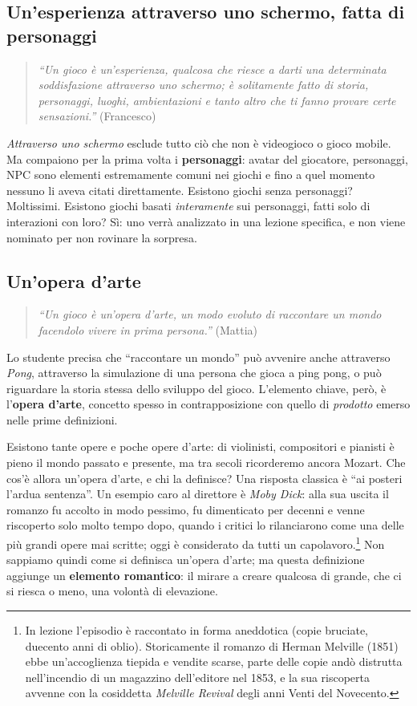 \subsection{Un'esperienza attraverso uno schermo, fatta di personaggi}

\begin{quote}
\emph{``Un gioco è un'esperienza, qualcosa che riesce a darti una determinata
soddisfazione attraverso uno schermo; è solitamente fatto di storia,
personaggi, luoghi, ambientazioni e tanto altro che ti fanno provare certe
sensazioni.''} (Francesco)
\end{quote}

\emph{Attraverso uno schermo} esclude tutto ciò che non è videogioco o gioco
mobile. Ma compaiono per la prima volta i \textbf{personaggi}: avatar del
giocatore, personaggi, NPC sono elementi estremamente comuni nei giochi e
fino a quel momento nessuno li aveva citati direttamente. Esistono giochi
senza personaggi? Moltissimi. Esistono giochi basati \emph{interamente} sui
personaggi, fatti solo di interazioni con loro? Sì: uno verrà analizzato in
una lezione specifica, e non viene nominato per non rovinare la sorpresa.

\subsection{Un'opera d'arte}

\begin{quote}
\emph{``Un gioco è un'opera d'arte, un modo evoluto di raccontare un mondo
facendolo vivere in prima persona.''} (Mattia)
\end{quote}

Lo studente precisa che ``raccontare un mondo'' può avvenire anche attraverso
\emph{Pong}, attraverso la simulazione di una persona che gioca a ping pong, o
può riguardare la storia stessa dello sviluppo del gioco. L'elemento chiave,
però, è l'\textbf{opera d'arte}, concetto spesso in contrapposizione con
quello di \emph{prodotto} emerso nelle prime definizioni.

Esistono tante opere e poche opere d'arte: di violinisti, compositori e
pianisti è pieno il mondo passato e presente, ma tra secoli ricorderemo ancora
Mozart. Che cos'è allora un'opera d'arte, e chi la definisce? Una risposta
classica è ``ai posteri l'ardua sentenza''. Un esempio caro al direttore è
\emph{Moby Dick}: alla sua uscita il romanzo fu accolto in modo pessimo, fu
dimenticato per decenni e venne riscoperto solo molto tempo dopo, quando i
critici lo rilanciarono come una delle più grandi opere mai scritte; oggi è
considerato da tutti un capolavoro.\footnote{In lezione l'episodio è
raccontato in forma aneddotica (copie bruciate, duecento anni di oblio).
Storicamente il romanzo di Herman Melville (1851) ebbe un'accoglienza tiepida
e vendite scarse, parte delle copie andò distrutta nell'incendio di un
magazzino dell'editore nel 1853, e la sua riscoperta avvenne con la cosiddetta
\emph{Melville Revival} degli anni Venti del Novecento.} Non sappiamo quindi
come si definisca un'opera d'arte; ma questa definizione aggiunge un
\textbf{elemento romantico}: il mirare a creare qualcosa di grande, che ci si
riesca o meno, una volontà di elevazione.

